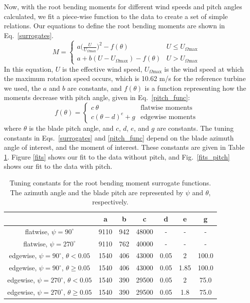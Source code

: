 \documentclass[11pt,letterpaper]{article}
\begin{document}
Now, with the root bending moments for different wind speeds and pitch angles calculated, we fit a piece-wise function to the data to create a set of simple relations. Our equations to define the root bending moments are shown in Eq.~\ref{surrogates}. 
% 
\begin{equation}
    \label{surrogates}
    M = \begin{cases} 
      a \Big(\frac{U}{U_{\Omega\text{max}}}\Big)^2 - f(\theta) & U \leq U_{\Omega\text{max}} \\
      a + b(U-U_{\Omega\text{max}}) - f(\theta) & U > U_{\Omega\text{max}}
   \end{cases}
\end{equation}
In this equation, $U$ is the effective wind speed, $U_{\Omega\text{max}}$ is the wind speed at which the maximum rotation speed occurs, which is 10.62 m/s for the reference turbine we used, the $a$ and $b$ are constants, and $f(\theta)$ is a function representing how the moments decrease with pitch angle, given in Eq.~\ref{pitch_func}:
\begin{equation}
    \label{pitch_func}
    f(\theta) = \begin{cases} 
      c ~\theta & \text{flatwise moments} \\
      c(\theta - d)^e + g & \text{edgewise moments}
   \end{cases}
\end{equation}
where $\theta$ is the blade pitch angle, and $c$, $d$, $e$, and $g$ are constants. The tuning constants in Eqs.~\ref{surrogates} and \ref{pitch_func} depend on the blade azimuth angle of interest, and the moment of interest. These constants are given in Table \ref{consts}. Figure \ref{fits} shows our fit to the data without pitch, and Fig.~\ref{fits_pitch} shows our fit to the data with pitch.

\begin{table}
\begin{center}
\caption{Tuning constants for the root bending moment surrogate functions. The azimuth angle and the blade pitch are represented by $\psi$ and $\theta$, respectively.\label{consts}}
\begin{tabular}{c|cccccc}
      & a & b & c & d & e & g \\ \midrule 
 flatwise, $\psi=90^\circ$ & 9110 & 942 & 48000 & - & - & - \\
 flatwise, $\psi=270^\circ$ & 9110 & 762 & 40000 & - & - & - \\
 edgewise, $\psi=90^\circ$, $\theta<0.05$ & 1540 & 406 & 43000 & 0.05 & 2 & 100.0 \\
 edgewise, $\psi=90^\circ$, $\theta \geq 0.05$ & 1540 & 406 & 43000 & 0.05 & 1.85 & 100.0 \\
 edgewise, $\psi=270^\circ$, $\theta < 0.05$ & 1540 & 390 & 29500 & 0.05 & 2 & 75.0 \\
 edgewise, $\psi=270^\circ$, $\theta \geq 0.05$ & 1540 & 390 & 29500 & 0.05 & 1.8 & 75.0 
\end{tabular}
\end{center}
\end{table}
\end{document}
